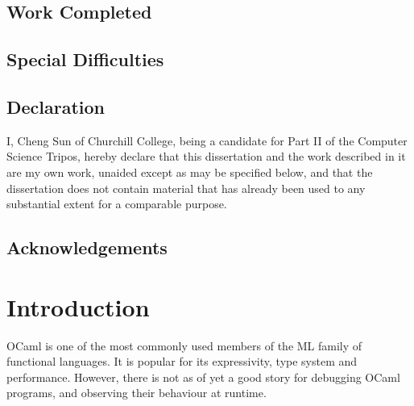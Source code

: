 \documentclass[12pt,a4paper,twoside,openright]{report}
\begin{document}
\section*{Work Completed}


\section*{Special Difficulties}

 
\newpage
\section*{Declaration}

I, Cheng Sun of Churchill College, being a candidate for Part II of the Computer
Science Tripos, hereby declare
that this dissertation and the work described in it are my own work,
unaided except as may be specified below, and that the dissertation
does not contain material that has already been used to any substantial
extent for a comparable purpose.

\bigskip
{}

\medskip
{}

\tableofcontents

\newpage
\section*{Acknowledgements}



\pagestyle{headings}

\chapter{Introduction}

OCaml is one of the most commonly used members of the ML family of functional
languages. It is popular for its expressivity, type system and performance.
However, there is not as of yet a good story for debugging OCaml programs, and
observing their behaviour at runtime.
\end{document}
